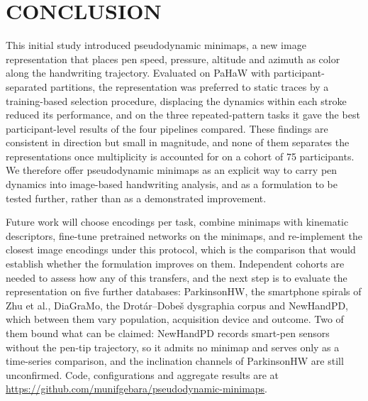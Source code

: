 \section{\uppercase{Conclusion}}
\label{sec:conclusion}
\noindent
This initial study introduced pseudodynamic minimaps, a new image representation that places pen speed, pressure, altitude and azimuth as color along the handwriting trajectory. Evaluated on PaHaW with participant-separated partitions, the representation was preferred to static traces by a training-based selection procedure, displacing the dynamics within each stroke reduced its performance, and on the three repeated-pattern tasks it gave the best participant-level results of the four pipelines compared. These findings are consistent in direction but small in magnitude, and none of them separates the representations once multiplicity is accounted for on a cohort of 75 participants. We therefore offer pseudodynamic minimaps as an explicit way to carry pen dynamics into image-based handwriting analysis, and as a formulation to be tested further, rather than as a demonstrated improvement.

Future work will choose encodings per task, combine minimaps with kinematic descriptors, fine-tune pretrained networks on the minimaps, and re-implement the closest image encodings under this protocol, which is the comparison that would establish whether the formulation improves on them. Independent cohorts are needed to assess how any of this transfers, and the next step is to evaluate the representation on five further databases: ParkinsonHW, the smartphone spirals of Zhu et al., DiaGraMo, the Drot\'ar--Dobe\v{s} dysgraphia corpus and NewHandPD, which between them vary population, acquisition device and outcome. Two of them bound what can be claimed: NewHandPD records smart-pen sensors without the pen-tip trajectory, so it admits no minimap and serves only as a time-series comparison, and the inclination channels of ParkinsonHW are still unconfirmed. Code, configurations and aggregate results are at \url{https://github.com/munifgebara/pseudodynamic-minimaps}.
